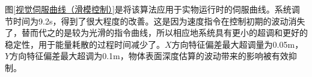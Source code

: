 \documentclass[fontset=fandol,type=bachelor,campus=harbin,bsmainpagenumberline=true]{hithesisbook}
\begin{document}
图\ref{视觉伺服曲线（滑模控制）}是将该算法应用于实物运行时的伺服曲线。系统调节时间为9.2s，得到了很大程度的改善。这是因为速度指令在控制初期的波动消失了，替而代之的是较为光滑的指令曲线，所以相应地系统具有更小的超调和更好的稳定性，用于能量耗散的过程时间减少了。$X$方向特征偏差最大超调量为0.05m，$Y$方向特征偏差最大超调为0.1m，物体表面深度估算的波动带来的影响被有效抑制。
\begin{figure}[h]
	\centering
\end{figure}
\end{document}
